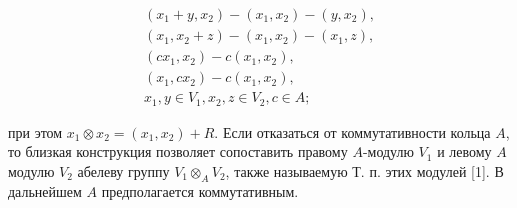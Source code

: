 \documentclass[10pt]{article}
\begin{document}
\[

\begin{gathered}

\left(x_{1}+y, x_{2}\right)-\left(x_{1}, x_{2}\right)-\left(y, x_{2}\right), \\

\left(x_{1}, x_{2}+z\right)-\left(x_{1}, x_{2}\right)-\left(x_{1}, z\right), \\

\left(c x_{1}, x_{2}\right)-c\left(x_{1}, x_{2}\right), \\

\left(x_{1}, c x_{2}\right)-c\left(x_{1}, x_{2}\right), \\

x_{1}, y \in V_{1}, x_{2}, z \in V_{2}, c \in A ;

\end{gathered}

\]



при этом $x_{1} \otimes x_{2}=\left(x_{1}, x_{2}\right)+R$. Если отказаться от коммутативности кольца $A$, то близкая конструкция позволяет сопоставить правому $A$-модулю $V_{1}$ и левому $A$ модулю $V_{2}$ абелеву группу $V_{1} \otimes_{A} V_{2}$, также называемую Т. п. этих модулей [1]. В дальнейшем $A$ предполагается коммутативным.
\end{document}
